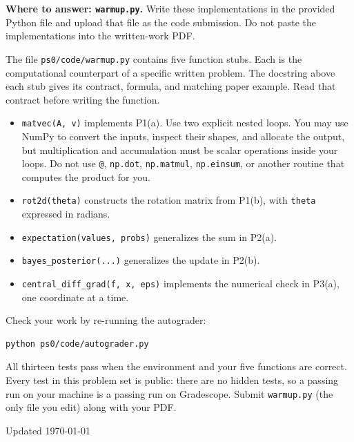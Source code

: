 \documentclass[11pt]{article}
\providecommand{\tightlist}{\setlength{\itemsep}{0pt}\setlength{\parskip}{0pt}}
\newcommand{\docfooter}{\vfill\begin{tiny}Updated \today\end{tiny}}
\begin{document}
\textbf{Where to answer: \texttt{warmup.py}.} Write these implementations in
the provided Python file and upload that file as the code submission. Do not
paste the implementations into the written-work PDF.

The file \texttt{ps0/code/warmup.py} contains five function
stubs. Each is the computational counterpart of a specific written problem.
The docstring above each stub gives its contract, formula, and matching
paper example. Read that contract before writing the function.

\begin{itemize}\tightlist
\item \texttt{matvec(A, v)} implements P1(a). Use two explicit nested loops.
      You may use NumPy to convert the inputs, inspect their shapes, and
      allocate the output, but multiplication and accumulation must be scalar
      operations inside your loops. Do not use \texttt{@}, \texttt{np.dot},
      \texttt{np.matmul}, \texttt{np.einsum}, or another routine that computes
      the product for you.
\item \texttt{rot2d(theta)} constructs the rotation matrix from P1(b), with
      \texttt{theta} expressed in radians.
\item \texttt{expectation(values, probs)} generalizes the sum in P2(a).
\item \texttt{bayes\_posterior(...)} generalizes the update in P2(b).
\item \texttt{central\_diff\_grad(f, x, eps)} implements the numerical
      check in P3(a), one coordinate at a time.
\end{itemize}

Check your work by re-running the autograder:

\begin{lstlisting}[language={}]
python ps0/code/autograder.py
\end{lstlisting}

All thirteen tests pass when the environment and your five functions are
correct. Every test in this problem set is public: there are no hidden
tests, so a passing run on your machine is a passing run on Gradescope.
Submit \texttt{warmup.py} (the only file you edit) along with your PDF.

\docfooter
\end{document}
